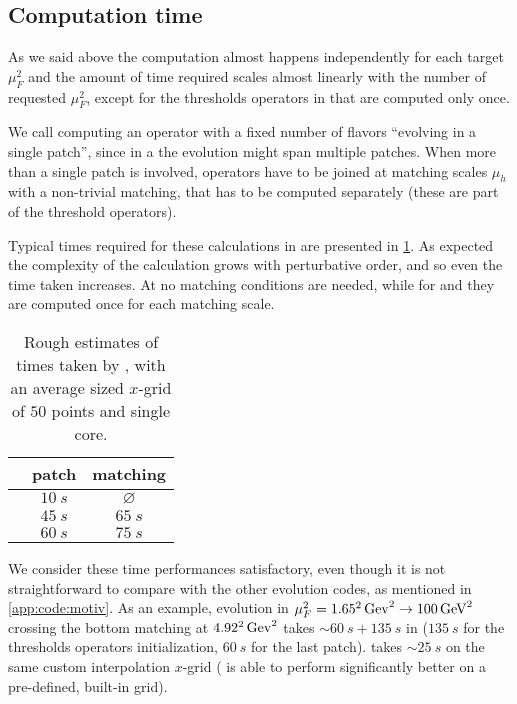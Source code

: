 \subsection{Computation time}
\label{app:code:time}

As we said above the computation almost happens independently for each target $\mu_F^2$
and the amount of time required scales almost linearly with the number of requested
$\mu_F^2$, except for the thresholds operators in \vfns{} that are computed only once.

We call computing an operator with a fixed number of flavors \enquote{evolving
in a single patch}, since in a \vfns{} the evolution might span multiple patches.
When more than a single patch is involved, operators have to be joined at
matching scales $\mu_h$ with a non-trivial matching, that has to be
computed separately (these are part of the threshold operators).

Typical times required for these calculations in \eko{} are presented in
\cref{tab:eko/time}.
As expected the complexity of the calculation grows with perturbative order,
and so even the time taken increases.
At \lo{} no matching conditions are needed, while for \nlo{} and
\nnlo{} they are computed once for each matching scale. 

\begin{table}[h]
    \centering
    \begin{tabular}{l|cc}
        & patch & matching \\
        \hline
        \lo{} & $\SI{10}{s}$ & $\varnothing$ \\
        \nlo{} & $\SI{45}{s}$ & $\SI{65}{s}$ \\
        \nnlo{} & $\SI{60}{s}$ & $\SI{75}{s}$ \\
    \end{tabular}
    \caption{Rough estimates of times taken by \eko{}, with an average sized
    $x$-grid of $50$ points and single core.}
    \label{tab:eko/time}
\end{table}

We consider these time performances satisfactory, even though it is not
straightforward to compare \eko{} with the other evolution codes, as mentioned
in \cref{app:code:motiv}. As an example, \nnlo{}
evolution in $\mu_F^2 = \SI[parse-numbers=false]{1.65^2}{Gev^2} \to
\SI{100}{GeV^2}$ crossing the bottom matching at
$\SI[parse-numbers=false]{4.92^2}{Gev^2}$ takes $\sim \SI{60}{s} + \SI{135}{s}$
in \eko{} ($\SI{135}{s}$ for the thresholds operators initialization,
$\SI{60}{s}$ for the last patch). \apfel{} takes $\sim\SI{25}{s}$ on the same
custom interpolation $x$-grid (\apfel{} is able to perform significantly better
on a pre-defined, built-in grid).

